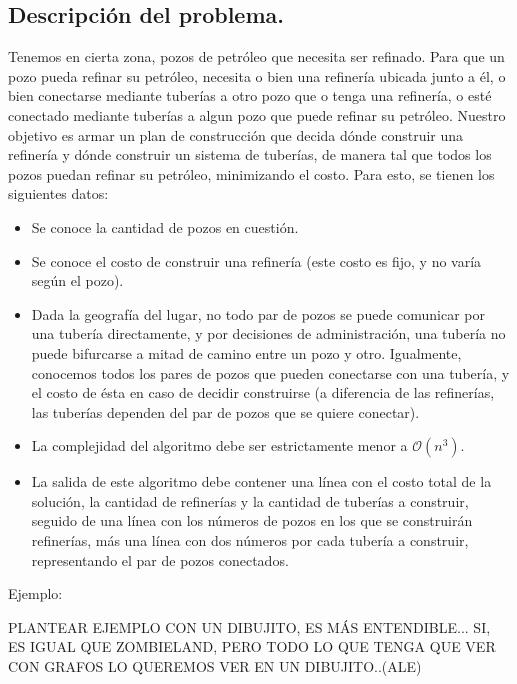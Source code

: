 \subsection{Descripción del problema.}

\vspace*{0.3cm}

Tenemos en cierta zona, pozos de petróleo que necesita ser refinado. Para que un pozo pueda refinar su petróleo, necesita o bien una refinería ubicada junto a él, o bien conectarse mediante tuberías a otro pozo que o tenga una refinería, o esté conectado mediante tuberías a algun pozo que puede refinar su petróleo. Nuestro objetivo es armar un plan de construcción que decida dónde construir una refinería y dónde construir un sistema de tuberías, de manera tal que todos los pozos puedan refinar su petróleo, minimizando el costo. Para esto, se tienen los siguientes datos:

\begin{itemize}
	\item Se conoce la cantidad de pozos en cuestión.
	\item Se conoce el costo de construir una refinería (este costo es fijo, y no varía según el pozo).
	\item Dada la geografía del lugar, no todo par de pozos se puede comunicar por una tubería directamente, y por decisiones de administración, una tubería no puede bifurcarse a mitad de camino entre un pozo y otro. Igualmente, conocemos todos los pares de pozos que pueden conectarse con una tubería, y el costo de ésta en caso de decidir construirse (a diferencia de las refinerías, las tuberías dependen del par de pozos que se quiere conectar).
	\item La complejidad del algoritmo debe ser estrictamente menor a $\mathcal{O}(n^3)$.
	\item La salida de este algoritmo debe contener una línea con el costo total de la solución, la cantidad de refinerías y la cantidad de tuberías a construir, seguido de una línea con los números de pozos en los que se construirán refinerías, más una línea con dos números por cada tubería a construir, representando el par de pozos conectados.	
\end{itemize}

Ejemplo:

PLANTEAR EJEMPLO CON UN DIBUJITO, ES MÁS ENTENDIBLE... SI, ES IGUAL QUE ZOMBIELAND, PERO TODO LO QUE TENGA QUE VER CON GRAFOS LO QUEREMOS VER EN UN DIBUJITO..(ALE)

\vspace*{0.6cm}

